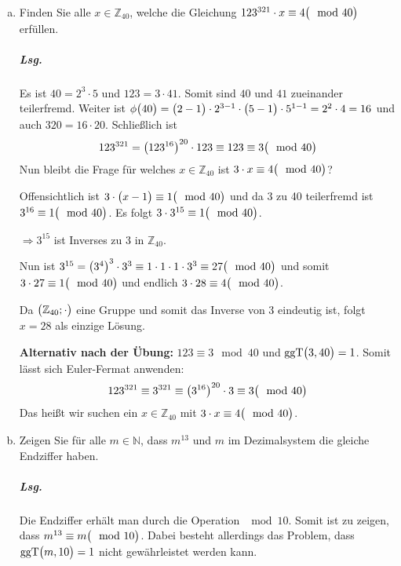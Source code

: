 \documentclass{scrreprt}
\newcommand{\ggT}[0]{\text{ggT}}
\begin{document}
\begin{enumerate}[(a)]
\newpage
\item Finden Sie alle $x \in \mathbb{Z}_{40}$, welche die Gleichung
  $123^{321} \cdot x \equiv 4 \qty\big(\mod 40)$ erfüllen.

  \subparagraph{Lsg.} Es ist $40 = 2^3 \cdot 5$ und $123 = 3 \cdot 41$.
  Somit sind $40$ und $41$ zueinander teilerfremd.
  Weiter ist $\phi\qty\big(40)
  = \qty\big(2 - 1) \cdot 2^{3 - 1} \cdot \qty\big(5 - 1) \cdot 5^{1 - 1}
  = 2^2 \cdot 4  = 16$ und auch $320 = 16 \cdot 20$.
  Schließlich ist
  \[
    123^{321} = \qty(123^{16})^{20} \cdot 123 \equiv 123 \equiv 3 \qty\big(\mod 40)
  \]
  Nun bleibt die Frage für welches $x \in \mathbb{Z}_{40}$ ist
  $3 \cdot x \equiv 4 \qty\big(\mod 40)$?

  Offensichtlich ist $3 \cdot \qty\big(x - 1) \equiv 1 \qty\big(\mod 40)$
  und da 3 zu 40 teilerfremd ist $3^{16} \equiv 1 \qty\big(\mod 40)$.
  Es folgt $3 \cdot 3^{15} \equiv 1 \qty\big(\mod 40)$.

  $\Rightarrow 3^{15}$ ist Inverses zu 3 in $\mathbb{Z}_{40}$.

  Nun ist $3^{15} = \qty\big(3^{4})^3 \cdot 3^3
  \equiv 1 \cdot 1 \cdot 1 \cdot 3^3
  \equiv 27 \qty\big(\mod 40)$ und somit $3 \cdot 27 \equiv 1 \qty\big(\mod 40)$
  und endlich $3 \cdot 28 \equiv 4 \qty\big(\mod 40)$.

  Da $\qty\big(\mathbb{Z}_{40}; \cdot)$ eine Gruppe und somit das Inverse von 3
  eindeutig ist, folgt $x = 28$ als einzige Lösung.

  \textbf{Alternativ nach der Übung:} $123 \equiv 3 \mod 40$ und
  $\ggT\qty\big(3, 40) = 1$.
  Somit lässt sich Euler-Fermat anwenden:
  \[
    123^{321} \equiv 3^{321} \equiv \qty(3^{16})^{20} \cdot 3 \equiv 3 \qty\big(\mod 40)
  \]
  Das heißt wir suchen ein $x \in \mathbb{Z}_{40}$ mit
  $3 \cdot x \equiv 4 \qty\big(\mod 40)$.

\item Zeigen Sie für alle $m \in \mathbb{N}$, dass $m^{13}$ und $m$ im
  Dezimalsystem die gleiche Endziffer haben.

  \subparagraph{Lsg.} Die Endziffer erhält man durch die Operation $\mod 10$.
  Somit ist zu zeigen, dass $m^{13} \equiv m \qty\big(\mod 10)$.
  Dabei besteht allerdings das Problem, dass $\ggT\qty\big(m, 10) = 1$ nicht
  gewährleistet werden kann.


\end{enumerate}
\end{document}
